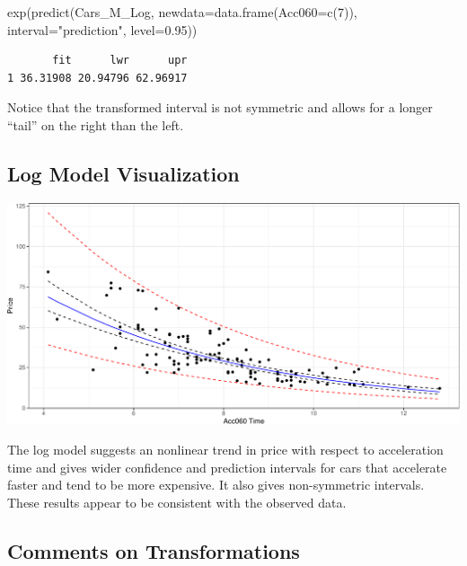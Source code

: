 \documentclass[
  letterpaper,
  DIV=11,
  numbers=noendperiod]{scrreprt}
\newenvironment{Shaded}{\begin{snugshade}}{\end{snugshade}}
\newcommand{\AttributeTok}[1]{\textcolor[rgb]{0.40,0.45,0.13}{#1}}
\newcommand{\DecValTok}[1]{\textcolor[rgb]{0.68,0.00,0.00}{#1}}
\newcommand{\FloatTok}[1]{\textcolor[rgb]{0.68,0.00,0.00}{#1}}
\newcommand{\FunctionTok}[1]{\textcolor[rgb]{0.28,0.35,0.67}{#1}}
\newcommand{\NormalTok}[1]{\textcolor[rgb]{0.00,0.23,0.31}{#1}}
\newcommand{\StringTok}[1]{\textcolor[rgb]{0.13,0.47,0.30}{#1}}
\begin{document}
\begin{Shaded}
\begin{Highlighting}[]
\FunctionTok{exp}\NormalTok{(}\FunctionTok{predict}\NormalTok{(Cars\_M\_Log, }\AttributeTok{newdata=}\FunctionTok{data.frame}\NormalTok{(}\AttributeTok{Acc060=}\FunctionTok{c}\NormalTok{(}\DecValTok{7}\NormalTok{)), }\AttributeTok{interval=}\StringTok{"prediction"}\NormalTok{, }\AttributeTok{level=}\FloatTok{0.95}\NormalTok{))}
\end{Highlighting}
\end{Shaded}

\begin{verbatim}
       fit      lwr      upr
1 36.31908 20.94796 62.96917
\end{verbatim}

Notice that the transformed interval is not symmetric and allows for a
longer ``tail'' on the right than the left.

\subsection{Log Model Visualization}\label{log-model-visualization}

\includegraphics{Ch5_files/figure-pdf/unnamed-chunk-29-1.pdf}

The log model suggests an nonlinear trend in price with respect to
acceleration time and gives wider confidence and prediction intervals
for cars that accelerate faster and tend to be more expensive. It also
gives non-symmetric intervals. These results appear to be consistent
with the observed data.

\subsection{Comments on
Transformations}\label{comments-on-transformations}
\end{document}
